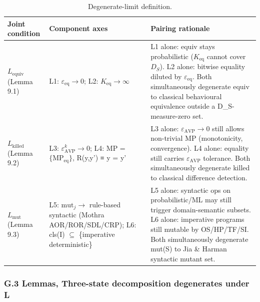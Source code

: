\documentclass[review,12pt,authoryear]{elsarticle}
\begin{document}
{\def\LTcaptype{table} %
\begin{longtable}[]{@{}
  >{\raggedright\arraybackslash}p{}
  >{\raggedright\arraybackslash}p{}
  >{\raggedright\arraybackslash}p{}@{}}
\caption{Degenerate-limit definition.}\label{tab:p2-29}\\
\toprule\noalign{}
\begin{minipage}[b]{\linewidth}\raggedright
Joint condition
\end{minipage} & \begin{minipage}[b]{\linewidth}\raggedright
Component axes
\end{minipage} & \begin{minipage}[b]{\linewidth}\raggedright
Pairing rationale
\end{minipage} \\
\midrule\noalign{}
\endfirsthead
\endhead
\bottomrule\noalign{}
\endlastfoot
\textbf{$L_{\mathrm{equiv}}$} (Lemma 9.1) & L1: $\varepsilon_{\mathrm{eq}} \to 0$; L2: $K_{\mathrm{eq}} \to \infty$ & L1 alone:
equiv stays probabilistic ($K_{\mathrm{eq}}$ cannot cover $D_S$). L2 alone: bitwise
equality diluted by $\varepsilon_{\mathrm{eq}}$. Both simultaneously degenerate equiv to
classical behavioural equivalence outside a D\_S-measure-zero set. \\
\textbf{$L_{\mathrm{killed}}$} (Lemma 9.2) & L3: $\varepsilon_{\mathrm{AVP}}^k \to 0$; L4: MP =
$\{\mathrm{MP}_{\mathrm{eq}}\}$, R(y,y') ≡ y = y' & L3 alone: $\varepsilon_{\mathrm{AVP}} \to 0$ still allows
non-trivial MP (monotonicity, convergence). L4 alone: equality still
carries $\varepsilon_{\mathrm{AVP}}$ tolerance. Both simultaneously degenerate killed to
classical difference detection. \\
\textbf{$L_{\mathrm{mut}}$} (Lemma 9.3) & L5: $\mathrm{mut}_j \to$ rule-based syntactic (Mothra
AOR/ROR/SDL/CRP); L6: cls(I) $\subseteq$ \{imperative deterministic\} & L5 alone:
syntactic ops on probabilistic/ML may still trigger domain-semantic
subsets. L6 alone: imperative programs still mutable by OS/HP/TF/SI.
Both simultaneously degenerate mut(S) to Jia \& Harman syntactic mutant
set. \\
\end{longtable}
}

\subsubsection{G.3 Lemmas, Three-state decomposition degenerates under L}\label{g.3-lemmas-three-state-decomposition-degenerates-under-l}
\end{document}
